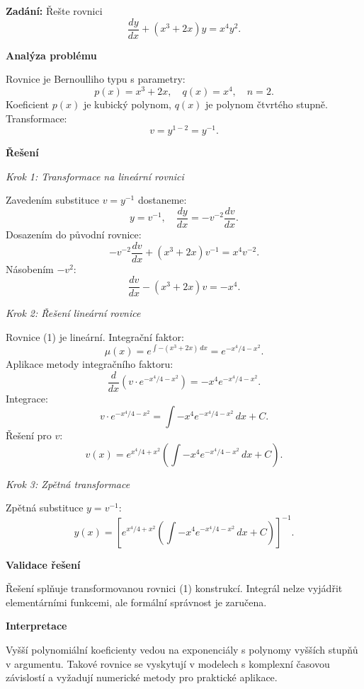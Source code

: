 \begin{example}
\label{ex:l2-a2-slozity-vyssi-polynomy}

\noindent\textbf{Zadání:} Řešte rovnici
\[
\frac{dy}{dx} + (x^3 + 2x)y = x^4 y^2.
\]

\vspace{1.5\baselineskip}

\noindent\textbf{Analýza problému}

\noindent Rovnice je Bernoulliho typu s parametry:
\[
p(x) = x^3 + 2x, \quad q(x) = x^4, \quad n = 2.
\]
Koeficient $p(x)$ je kubický polynom, $q(x)$ je polynom čtvrtého stupně. Transformace:
\[
v = y^{1-2} = y^{-1}.
\]

\vspace{1.5\baselineskip}

\noindent\textbf{Řešení}

\noindent\textit{Krok 1: Transformace na lineární rovnici}

Zavedením substituce $v = y^{-1}$ dostaneme:
\[
y = v^{-1}, \quad \frac{dy}{dx} = -v^{-2}\frac{dv}{dx}.
\]
Dosazením do původní rovnice:
\[
-v^{-2}\frac{dv}{dx} + (x^3 + 2x)v^{-1} = x^4 v^{-2}.
\]
Násobením $-v^2$:
\[
\frac{dv}{dx} - (x^3 + 2x)v = -x^4. \tag{1}
\]

\vspace{1\baselineskip}

\noindent\textit{Krok 2: Řešení lineární rovnice}

Rovnice (1) je lineární. Integrační faktor:
\[
\mu(x) = e^{\int -(x^3 + 2x)\,dx} = e^{-x^4/4 - x^2}.
\]
Aplikace metody integračního faktoru:
\[
\frac{d}{dx}(v \cdot e^{-x^4/4 - x^2}) = -x^4 e^{-x^4/4 - x^2}.
\]
Integrace:
\[
v \cdot e^{-x^4/4 - x^2} = \int -x^4 e^{-x^4/4 - x^2}\,dx + C.
\]
Řešení pro $v$:
\[
v(x) = e^{x^4/4 + x^2} \left( \int -x^4 e^{-x^4/4 - x^2}\,dx + C \right). \tag{2}
\]

\vspace{1\baselineskip}

\noindent\textit{Krok 3: Zpětná transformace}

Zpětná substituce $y = v^{-1}$:
\[
y(x) = \left[ e^{x^4/4 + x^2} \left( \int -x^4 e^{-x^4/4 - x^2}\,dx + C \right) \right]^{-1}. \tag{3}
\]

\vspace{1.5\baselineskip}

\noindent\textbf{Validace řešení}

Řešení splňuje transformovanou rovnici (1) konstrukcí. Integrál nelze vyjádřit elementárními funkcemi, ale formální správnost je zaručena.

\vspace{1.5\baselineskip}

\noindent\textbf{Interpretace}

Vyšší polynomiální koeficienty vedou na exponenciály s polynomy vyšších stupňů v argumentu. Takové rovnice se vyskytují v modelech s komplexní časovou závislostí a vyžadují numerické metody pro praktické aplikace.

\end{example}

